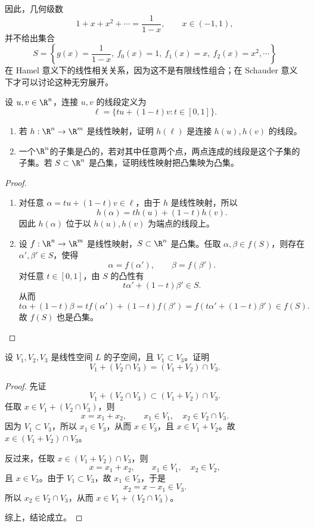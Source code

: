 	因此，几何级数
	\[
	1+x+x^2+\cdots=\frac{1}{1-x},
	\qquad x\in(-1,1),
	\]
	并不给出集合
	\[
	S=\left\{g(x)=\frac{1}{1-x},\ f_0(x)=1,\ f_1(x)=x,\ f_2(x)=x^2,\cdots\right\}
	\]
	在 Hamel 意义下的线性相关关系，因为这不是有限线性组合；在 Schauder 意义下才可以讨论这种无穷展开。


\begin{problem}[线段与凸集]
	\label{p1:concept:c4-l3135}设 $u,v\in\R^n$，连接 $u,v$ 的线段定义为
	\[
	\ell=\{tu+(1-t)v:t\in[0,1]\}.
	\]
	\begin{enumerate}
		\item 若 $h:\R^n\to\R^m$ 是线性映射，证明 $h(\ell)$ 是连接 $h(u),h(v)$ 的线段。
		\item {}\label{p1:concept:c4-l3141}一个$\R^n$的子集是凸的，若对其中任意两个点，两点连成的线段是这个子集的子集。若 $S\subset\R^n$ 是凸集，证明线性映射把凸集映为凸集。
	\end{enumerate}
\end{problem}

\begin{proof}
	\begin{enumerate}
		\item 对任意 $\alpha=tu+(1-t)v\in\ell$，由于 $h$ 是线性映射，所以
		\[
		h(\alpha)=t h(u)+(1-t)h(v).
		\]
		因此 $h(\alpha)$ 位于以 $h(u),h(v)$ 为端点的线段上。
		\item 设 $f:\R^n\to\R^m$ 是线性映射，$S\subset\R^n$ 是凸集。任取 $\alpha,\beta\in f(S)$，则存在 $\alpha',\beta'\in S$，使得
		\[
		\alpha=f(\alpha'),
		\qquad
		\beta=f(\beta').
		\]
		对任意 $t\in[0,1]$，由 $S$ 的凸性有
		\[
		t\alpha'+(1-t)\beta'\in S.
		\]
		从而
		\[
		t\alpha+(1-t)\beta
		=t f(\alpha')+(1-t)f(\beta')
		=f(t\alpha'+(1-t)\beta')\in f(S).
		\]
		故 $f(S)$ 也是凸集。
	\end{enumerate}
\end{proof}

\begin{problem}
	设 $V_1,V_2,V_3$ 是线性空间 $L$ 的子空间，且 $V_1\subset V_3$。证明
	\[
	V_1+(V_2\cap V_3)=(V_1+V_2)\cap V_3.
	\]
\end{problem}

\begin{proof}
	先证
	\[
	V_1+(V_2\cap V_3)\subset (V_1+V_2)\cap V_3.
	\]
	任取 $x\in V_1+(V_2\cap V_3)$，则
	\[
	x=x_1+x_2,
	\qquad x_1\in V_1,
	\quad x_2\in V_2\cap V_3.
	\]
	因为 $V_1\subset V_3$，所以 $x_1\in V_3$，从而 $x\in V_3$，且 $x\in V_1+V_2$。故
	$x\in (V_1+V_2)\cap V_3$。
	
	反过来，任取 $x\in (V_1+V_2)\cap V_3$，则
	\[
	x=x_1+x_2,
	\qquad x_1\in V_1,
	\quad x_2\in V_2,
	\]
	且 $x\in V_3$。由于 $V_1\subset V_3$，故 $x_1\in V_3$，于是
	\[
	x_2=x-x_1\in V_3.
	\]
	所以 $x_2\in V_2\cap V_3$，从而 $x\in V_1+(V_2\cap V_3)$。
	
	综上，结论成立。
\end{proof}

